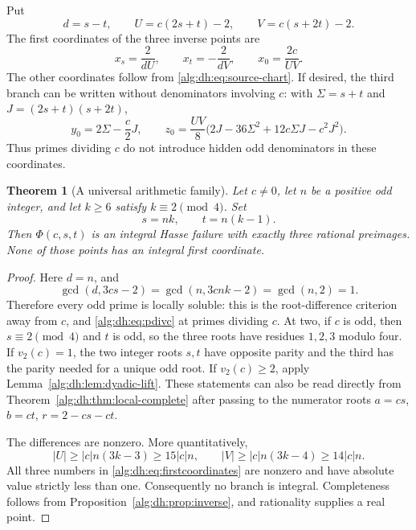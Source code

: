 \documentclass[11pt]{article}
\numberwithin{equation}{section}
\newtheorem{theorem}{Theorem}[section]
\theoremstyle{plain}
\theoremstyle{plain}
\theoremstyle{plain}
\theoremstyle{definition}
\theoremstyle{definition}
\theoremstyle{definition}
\theoremstyle{remark}
\begin{document}
Put
\begin{equation}\label{alg:dh:eq:duv}
 d=s-t,\qquad U=c(2s+t)-2,\qquad V=c(s+2t)-2.
\end{equation}
The first coordinates of the three inverse points are
\begin{equation}\label{alg:dh:eq:firstcoordinates}
 x_s=\frac2{dU},\qquad x_t=-\frac2{dV},\qquad
 x_0=\frac{2c}{UV}.
\end{equation}
The other coordinates follow from \eqref{alg:dh:eq:source-chart}. If desired,
the third branch can be written without denominators involving $c$:
with $\Sigma=s+t$ and $J=(2s+t)(s+2t)$,
\begin{equation}\label{alg:dh:eq:thirdbranch}
 y_0=2\Sigma-\frac c2J,\qquad
 z_0=\frac{UV}{8}\bigl(2J-36\Sigma^2+12c\Sigma J-c^2J^2\bigr).
\end{equation}
Thus primes dividing $c$ do not introduce hidden odd denominators in
these coordinates.

\begin{theorem}[A universal arithmetic family]\label{alg:dh:thm:family}
Let $c\ne0$, let $n$ be a positive odd integer, and let
$k\ge6$ satisfy $k\equiv2\pmod4$. Set
\begin{equation}\label{alg:dh:eq:family-parameters}
 s=nk,\qquad t=n(k-1).
\end{equation}
Then $\Phi(c,s,t)$ is an integral Hasse failure with exactly three
rational preimages. None of those points has an integral first coordinate.
\end{theorem}
\begin{proof}
Here $d=n$, and
\[
 \gcd(d,3cs-2)=\gcd(n,3cnk-2)=\gcd(n,2)=1.
\]
Therefore every odd prime is locally soluble: this is the root-difference
criterion away from $c$, and \eqref{alg:dh:eq:pdivc} at primes dividing $c$.
At two, if $c$ is odd, then $s\equiv2\pmod4$ and $t$ is odd, so the
three roots have residues $1,2,3$ modulo four. If $v_2(c)=1$, the two
integer roots $s,t$ have opposite parity and the third has the parity
needed for a unique odd root. If $v_2(c)\ge2$, apply
Lemma~\ref{alg:dh:lem:dyadic-lift}. These statements can also be read directly
from Theorem~\ref{alg:dh:thm:local-complete} after passing to the numerator roots
$a=cs$, $b=ct$, $r=2-cs-ct$.

The differences are nonzero. More quantitatively,
\[
 |U|\ge |c|n(3k-3)\ge15|c|n,\qquad
 |V|\ge |c|n(3k-4)\ge14|c|n.
\]
All three numbers in \eqref{alg:dh:eq:firstcoordinates} are nonzero and have
absolute value strictly less than one. Consequently no branch is
integral. Completeness follows from Proposition~\ref{alg:dh:prop:inverse},
and rationality supplies a real point.
\end{proof}
\end{document}
